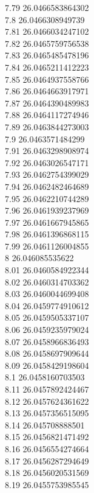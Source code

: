 {7.79	26.0466583864302\\
7.8	26.0466308949739\\
7.81	26.0466034247102\\
7.82	26.0465759756538\\
7.83	26.0465485478196\\
7.84	26.0465211412223\\
7.85	26.0464937558766\\
7.86	26.0464663917971\\
7.87	26.0464390489983\\
7.88	26.0464117274946\\
7.89	26.0463844273003\\
7.9	26.0463571484299\\
7.91	26.0463298908974\\
7.92	26.0463026547171\\
7.93	26.0462754399029\\
7.94	26.0462482464689\\
7.95	26.0462210744289\\
7.96	26.0461939237969\\
7.97	26.0461667945865\\
7.98	26.0461396868115\\
7.99	26.0461126004855\\
8	26.046085535622\\
8.01	26.0460584922344\\
8.02	26.0460314703362\\
8.03	26.0460044699408\\
8.04	26.0459774910612\\
8.05	26.0459505337107\\
8.06	26.0459235979024\\
8.07	26.0458966836493\\
8.08	26.0458697909644\\
8.09	26.0458429198604\\
8.1	26.0458160703503\\
8.11	26.0457892424467\\
8.12	26.0457624361622\\
8.13	26.0457356515095\\
8.14	26.045708888501\\
8.15	26.0456821471492\\
8.16	26.0456554274664\\
8.17	26.0456287294649\\
8.18	26.0456020531569\\
8.19	26.0455753985545\\
}
